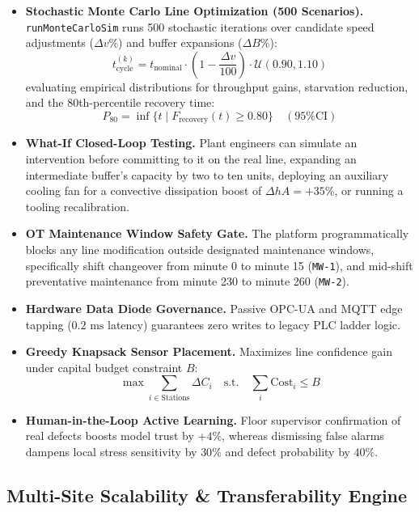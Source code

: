\documentclass[11pt]{article}
\begin{document}
\begin{itemize}[leftmargin=1.2cm]
    \item \textbf{Stochastic Monte Carlo Line Optimization (500 Scenarios).} \texttt{runMonteCarloSim} runs 500 stochastic iterations over candidate speed adjustments ($\Delta v\%$) and buffer expansions ($\Delta B\%$):
    \begin{equation}
    t_{\text{cycle}}^{(k)} = t_{\text{nominal}} \cdot \left(1 - \frac{\Delta v}{100}\right) \cdot \mathcal{U}(0.90, 1.10)
    \end{equation}
    evaluating empirical distributions for throughput gains, starvation reduction, and the 80th-percentile recovery time:
    \begin{equation}
    P_{80} = \inf \big\{ t \mid F_{\text{recovery}}(t) \ge 0.80 \big\} \quad (\text{95\% CI})
    \end{equation}
    \item \textbf{What-If Closed-Loop Testing.} Plant engineers can simulate an intervention before committing to it on the real line, expanding an intermediate buffer's capacity by two to ten units, deploying an auxiliary cooling fan for a convective dissipation boost of $\Delta hA = +35\%$, or running a tooling recalibration.
    \item \textbf{OT Maintenance Window Safety Gate.} The platform programmatically blocks any line modification outside designated maintenance windows, specifically shift changeover from minute 0 to minute 15 (\texttt{MW-1}), and mid-shift preventative maintenance from minute 230 to minute 260 (\texttt{MW-2}).
    \item \textbf{Hardware Data Diode Governance.} Passive OPC-UA and MQTT edge tapping ($0.2\text{ ms}$ latency) guarantees zero writes to legacy PLC ladder logic.
    \item \textbf{Greedy Knapsack Sensor Placement.} Maximizes line confidence gain under capital budget constraint $B$:
    \begin{equation}
    \max \sum_{i \in \text{Stations}} \Delta C_i \quad \text{s.t.} \quad \sum_{i} \text{Cost}_i \le B
    \end{equation}
    \item \textbf{Human-in-the-Loop Active Learning.} Floor supervisor confirmation of real defects boosts model trust by $+4\%$, whereas dismissing false alarms dampens local stress sensitivity by $30\%$ and defect probability by $40\%$.
\end{itemize}

\subsection{Multi-Site Scalability \& Transferability Engine}
\end{document}
